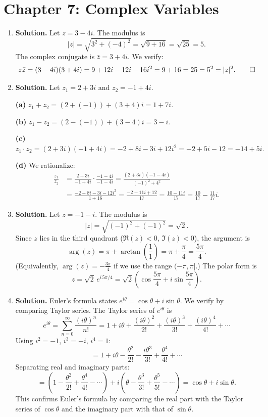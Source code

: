 \chapter{Chapter 7: Complex Variables}
\begin{enumerate}

\item \textbf{Solution.}
Let $z = 3 - 4i$. The modulus is
\[
|z| = \sqrt{3^2 + (-4)^2} = \sqrt{9 + 16} = \sqrt{25} = 5.
\]
The complex conjugate is $\bar{z} = 3 + 4i$. We verify:
\[
z\bar{z} = (3 - 4i)(3 + 4i) = 9 + 12i - 12i - 16i^2 = 9 + 16 = 25 = 5^2 = |z|^2. \qed
\]

\item \textbf{Solution.}
Let $z_1 = 2 + 3i$ and $z_2 = -1 + 4i$.

\textbf{(a)} $z_1 + z_2 = (2 + (-1)) + (3 + 4)i = 1 + 7i.$

\textbf{(b)} $z_1 - z_2 = (2 - (-1)) + (3 - 4)i = 3 - i.$

\textbf{(c)} $z_1 \cdot z_2 = (2 + 3i)(-1 + 4i) = -2 + 8i - 3i + 12i^2 = -2 + 5i - 12 = -14 + 5i.$

\textbf{(d)} We rationalize:
\begin{align*}
\frac{z_1}{z_2} &= \frac{2 + 3i}{-1 + 4i} \cdot \frac{-1 - 4i}{-1 - 4i}
= \frac{(2 + 3i)(-1 - 4i)}{(-1)^2 + 4^2} \\
&= \frac{-2 - 8i - 3i - 12i^2}{1 + 16}
= \frac{-2 - 11i + 12}{17}
= \frac{10 - 11i}{17} = \frac{10}{17} - \frac{11}{17}i.
\end{align*}

\item \textbf{Solution.}
Let $z = -1 - i$. The modulus is
\[
|z| = \sqrt{(-1)^2 + (-1)^2} = \sqrt{2}.
\]
Since $z$ lies in the third quadrant ($\Re(z) < 0$, $\Im(z) < 0$), the argument is
\[
\arg(z) = \pi + \arctan\!\left(\frac{1}{1}\right) = \pi + \frac{\pi}{4} = \frac{5\pi}{4}.
\]
(Equivalently, $\arg(z) = -\frac{3\pi}{4}$ if we use the range $(-\pi, \pi]$.) The polar form is
\[
z = \sqrt{2}\,e^{i\,5\pi/4} = \sqrt{2}\left(\cos\frac{5\pi}{4} + i\sin\frac{5\pi}{4}\right).
\]

\item \textbf{Solution.}
Euler's formula states $e^{i\theta} = \cos\theta + i\sin\theta$. We verify by comparing Taylor series. The Taylor series of $e^{i\theta}$ is
\[
e^{i\theta} = \sum_{n=0}^{\infty} \frac{(i\theta)^n}{n!} = 1 + i\theta + \frac{(i\theta)^2}{2!} + \frac{(i\theta)^3}{3!} + \frac{(i\theta)^4}{4!} + \cdots
\]
Using $i^2 = -1$, $i^3 = -i$, $i^4 = 1$:
\[
= 1 + i\theta - \frac{\theta^2}{2!} - \frac{i\theta^3}{3!} + \frac{\theta^4}{4!} + \cdots
\]
Separating real and imaginary parts:
\[
= \left(1 - \frac{\theta^2}{2!} + \frac{\theta^4}{4!} - \cdots\right) + i\left(\theta - \frac{\theta^3}{3!} + \frac{\theta^5}{5!} - \cdots\right) = \cos\theta + i\sin\theta.
\]
This confirms Euler's formula by comparing the real part with the Taylor series of $\cos\theta$ and the imaginary part with that of $\sin\theta$.


\end{enumerate}
